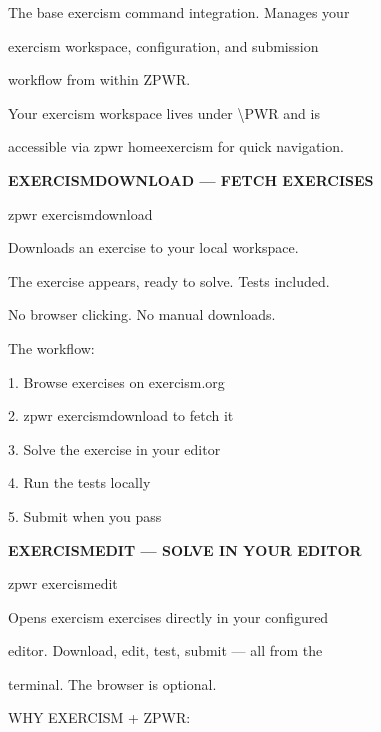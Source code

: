 \documentclass[11pt,a4paper,twoside]{book}
\begin{document}
The base exercism command integration. Manages your

exercism workspace, configuration, and submission

workflow from within ZPWR.

Your exercism workspace lives under \textbackslash{}PWR and is

\begin{codebox}
accessible via zpwr homeexercism for quick navigation.\\
\end{codebox}


\vspace{12pt}
{\bfseries\color{neonyellow} EXERCISMDOWNLOAD — FETCH EXERCISES}\vspace{4pt}

\begin{codebox}
zpwr exercismdownload\\
\end{codebox}

Downloads an exercise to your local workspace.

The exercise appears, ready to solve. Tests included.

No browser clicking. No manual downloads.

The workflow:

1. Browse exercises on exercism.org

\begin{codebox}
2. zpwr exercismdownload to fetch it\\
\end{codebox}

3. Solve the exercise in your editor

4. Run the tests locally

5. Submit when you pass


\vspace{12pt}
{\bfseries\color{neonyellow} EXERCISMEDIT — SOLVE IN YOUR EDITOR}\vspace{4pt}

\begin{codebox}
zpwr exercismedit\\
\end{codebox}

Opens exercism exercises directly in your configured

editor. Download, edit, test, submit — all from the

terminal. The browser is optional.

WHY EXERCISM + ZPWR:
\end{document}
